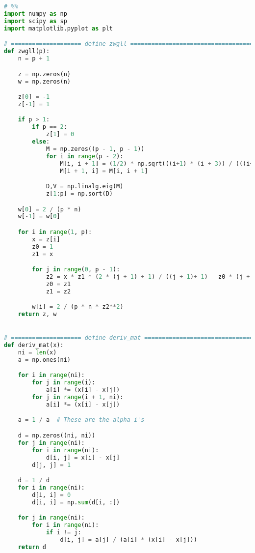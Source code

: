 \documentclass[11pt,letterpaper]{article}
\begin{document}
\newpage
\section*{}
\begin{lstlisting}[language=Python, caption=Question 2 (b) Python code]
# %%
import numpy as np
import scipy as sp
import matplotlib.pyplot as plt

# ==================== define zwgll ===================================
def zwgll(p):
    n = p + 1

    z = np.zeros(n)
    w = np.zeros(n)

    z[0] = -1
    z[-1] = 1

    if p > 1:
        if p == 2:
            z[1] = 0
        else:
            M = np.zeros((p - 1, p - 1))
            for i in range(p - 2):
                M[i, i + 1] = (1/2) * np.sqrt(((i+1) * (i + 3)) / (((i+1) + 1/2) * ((i+1)+ 3/2)))
                M[i + 1, i] = M[i, i + 1]

            D,V = np.linalg.eig(M)
            z[1:p] = np.sort(D)

    w[0] = 2 / (p * n)
    w[-1] = w[0]

    for i in range(1, p):
        x = z[i]
        z0 = 1
        z1 = x

        for j in range(0, p - 1):
            z2 = x * z1 * (2 * (j + 1) + 1) / ((j + 1)+ 1) - z0 * (j + 1) / ((j + 1) + 1)
            z0 = z1
            z1 = z2

        w[i] = 2 / (p * n * z2**2)
    return z, w


# ==================== define deriv_mat ===============================
def deriv_mat(x):
    ni = len(x)
    a = np.ones(ni)

    for i in range(ni):
        for j in range(i):
            a[i] *= (x[i] - x[j])
        for j in range(i + 1, ni):
            a[i] *= (x[i] - x[j])

    a = 1 / a  # These are the alpha_i's

    d = np.zeros((ni, ni))
    for j in range(ni):
        for i in range(ni):
            d[i, j] = x[i] - x[j]
        d[j, j] = 1

    d = 1 / d
    for i in range(ni):
        d[i, i] = 0
        d[i, i] = np.sum(d[i, :])

    for j in range(ni):
        for i in range(ni):
            if i != j:
                d[i, j] = a[j] / (a[i] * (x[i] - x[j]))
    return d


\end{lstlisting}
\end{document}
